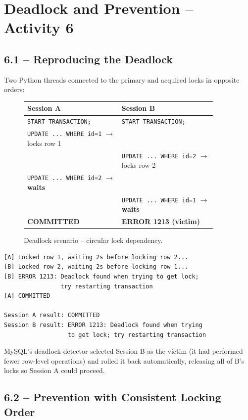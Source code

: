 \documentclass[12pt,a4paper]{article}
\begin{document}
\section{Deadlock and Prevention -- Activity 6}

\subsection{6.1 -- Reproducing the Deadlock}

Two Python threads connected to the primary and acquired locks in opposite
orders:

\begin{figure}[H]
\centering
\begin{tabular}{p{0.45\linewidth}|p{0.45\linewidth}}
\textbf{Session A} & \textbf{Session B} \\
\hline
\texttt{START TRANSACTION;} & \texttt{START TRANSACTION;} \\
\texttt{UPDATE ... WHERE id=1} $\to$ locks row 1 & \\
& \texttt{UPDATE ... WHERE id=2} $\to$ locks row 2 \\
\texttt{UPDATE ... WHERE id=2} $\to$ \textbf{waits} & \\
& \texttt{UPDATE ... WHERE id=1} $\to$ \textbf{waits} \\
\textbf{COMMITTED} & \textbf{ERROR 1213 (victim)} \\
\end{tabular}
\caption{Deadlock scenario -- circular lock dependency.}
\end{figure}

\begin{lstlisting}[style=bashstyle, caption={Observed deadlock output.}]
[A] Locked row 1, waiting 2s before locking row 2...
[B] Locked row 2, waiting 2s before locking row 1...
[B] ERROR 1213: Deadlock found when trying to get lock;
                try restarting transaction
[A] COMMITTED

Session A result: COMMITTED
Session B result: ERROR 1213: Deadlock found when trying
                  to get lock; try restarting transaction
\end{lstlisting}

MySQL's deadlock detector selected Session B as the victim (it had performed
fewer row-level operations) and rolled it back automatically, releasing all of
B's locks so Session A could proceed.

\subsection{6.2 -- Prevention with Consistent Locking Order}
\end{document}
